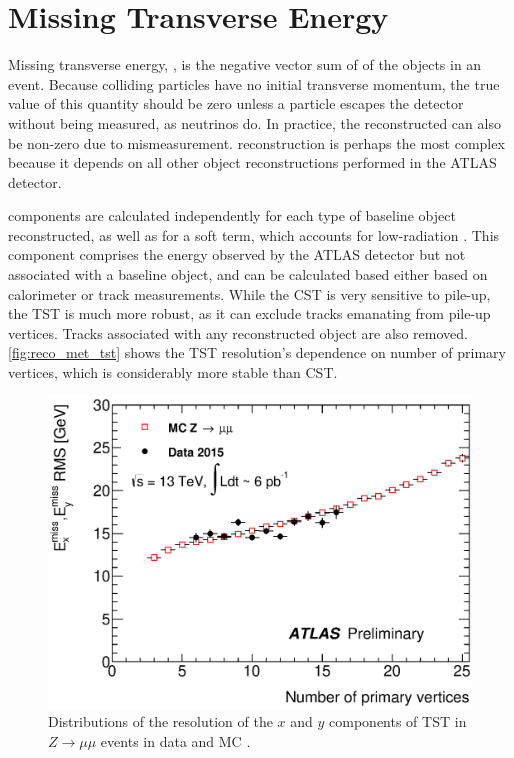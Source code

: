 \section{Missing Transverse Energy}
\label{sec:reco_met}

Missing transverse energy, \met, is the negative vector sum of \pt of the objects in an event. Because colliding particles have no initial transverse momentum, the true value of this quantity should be zero unless a particle escapes the detector without being measured, as neutrinos do. In practice, the reconstructed \met can also be non-zero due to mismeasurement. \met reconstruction is perhaps the most complex because it depends on all other object reconstructions performed in the ATLAS detector. 

\met components are calculated independently for each type of baseline object reconstructed, as well as for a soft term, which accounts for low-\pt radiation \cite{ATL-PHYS-PUB-2015-023}. This component comprises the energy observed by the ATLAS detector but not associated with a baseline object, and can be calculated based either based on calorimeter or track measurements. While the \acf{CST} is very sensitive to pile-up, the \acf{TST} is much more robust, as it can exclude tracks emanating from pile-up vertices. Tracks associated with any reconstructed object are also removed. \autoref{fig:reco_met_tst} shows the \ac{TST} resolution's dependence on number of primary vertices, which is considerably more stable than \ac{CST}.

\begin{centering}
\begin{figure}[!hbt]
\myfloatalign
\includegraphics[width=.9\linewidth]{figures/reco/met_fig_04b.eps}
\caption{ Distributions of the resolution of the $x$ and $y$ components of \ac{TST} \met in $Z\rightarrow\mu\mu$ events in data and \ac{MC} \cite{ATL-PHYS-PUB-2015-027}. }
\label{fig:reco_met_tst}
\end{figure}
\end{centering}

